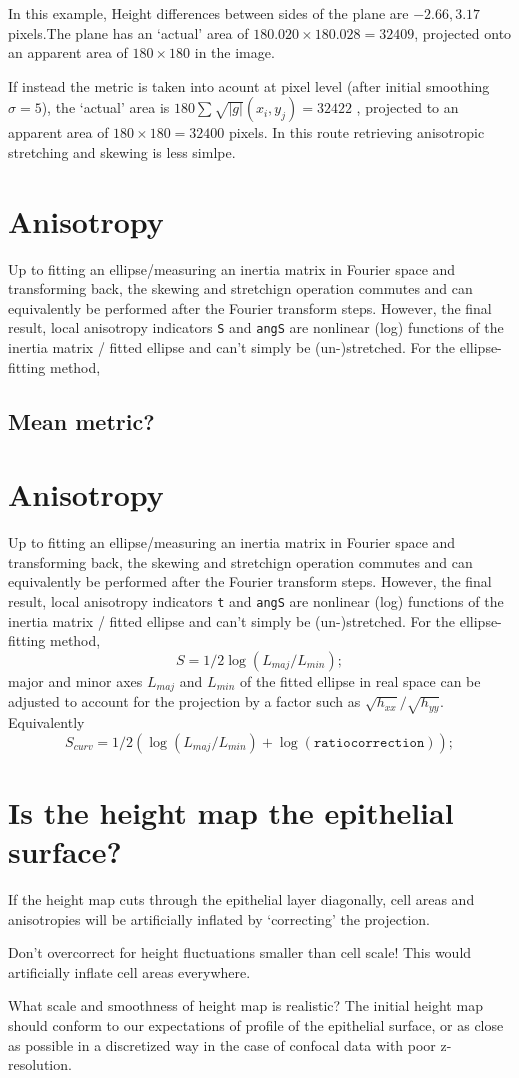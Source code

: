 \documentclass[10pt,a4paper]{article}
\begin{document}
In this example, Height differences between sides of the plane are $-2.66, 3.17$ pixels.The plane has an `actual' area of $180.020 \times 180.028 = 32409 $, projected onto an apparent area of $180 \times 180$  in the image.

If instead the metric is taken into acount at pixel level (after initial smoothing $\sigma =5$), the `actual' area is $180 \sum \sqrt{|g|}(x_i, y_j) =32422 $ , projected to an apparent area of $180 \times 180 = 32400$ pixels.  In this route retrieving anisotropic stretching and skewing is less simlpe.
\section{Anisotropy}
Up to fitting an ellipse/measuring an inertia matrix in Fourier space and transforming back, the skewing and stretchign operation commutes and can equivalently be performed after the Fourier transform steps.  However, the final result, local anisotropy indicators \texttt{S} and \texttt{angS} are nonlinear (log) functions of the inertia matrix / fitted ellipse and can't simply be (un-)stretched.  For the ellipse-fitting method, 

\subsection{Mean metric?}
\section{Anisotropy}
Up to fitting an ellipse/measuring an inertia matrix in Fourier space and transforming back, the skewing and stretchign operation commutes and can equivalently be performed after the Fourier transform steps.  However, the final result, local anisotropy indicators \texttt{t} and \texttt{angS} are nonlinear (log) functions of the inertia matrix / fitted ellipse and can't simply be (un-)stretched.  For the ellipse-fitting method, 
\begin{equation}
S = 1/2 \log(L_{maj}/L_{min});
\end{equation}
major and minor axes $L_{maj}$ and $L_{min}$ of the fitted ellipse in real space can be adjusted to account for the projection by a factor such as $\sqrt{h_{xx}}/\sqrt{h_{yy}}$.  Equivalently 
\begin{equation}
S_{curv} = 1/2 \left( \log(L_{maj}/L_{min}) + \log(\mathtt{ratiocorrection}) \right);
\end{equation}
\section{Is the height map the epithelial surface?}
If the height map cuts through the epithelial layer diagonally, cell areas and anisotropies will be artificially inflated by `correcting' the projection.

Don't overcorrect for height fluctuations smaller than cell scale!  This would artificially inflate cell areas everywhere.

What scale and smoothness of height map is realistic?  The initial height map should conform to our expectations of profile of the epithelial surface, or as close as possible in a discretized way in the case of confocal data with poor z-resolution.
\end{document}
